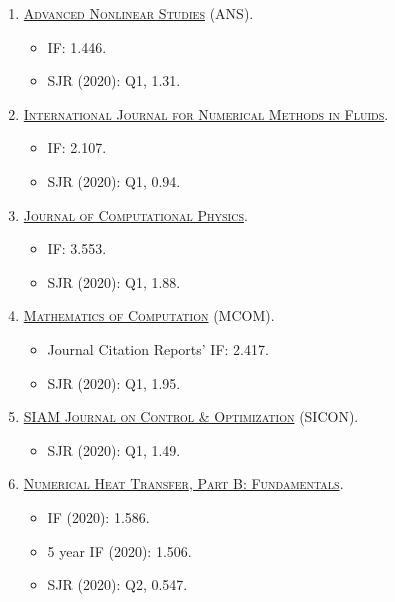 \documentclass{article}
\numberwithin{equation}{section}
\begin{document}
\begin{enumerate}
	\item \textsc{\href{https://www.degruyter.com/journal/key/ans/html}{Advanced Nonlinear Studies} (ANS).}
	\begin{itemize}
		\item IF: 1.446.
		\item SJR (2020): Q1, 1.31.
	\end{itemize}
	\item \textsc{\href{https://onlinelibrary.wiley.com/journal/10970363}{International Journal for Numerical Methods in Fluids}.}
	\begin{itemize}
		\item IF: 2.107.
		\item SJR (2020): Q1, 0.94.
	\end{itemize}
	\item \textsc{\href{https://www.journals.elsevier.com/journal-of-computational-physics}{Journal of Computational Physics}.}
	\begin{itemize}
		\item IF: 3.553.
		\item SJR (2020): Q1, 1.88.
	\end{itemize}
	\item \textsc{\href{https://www.ams.org/publications/journals/journalsframework/mcom}{Mathematics of Computation} (MCOM).}
	\begin{itemize}
		\item Journal Citation Reports' IF: 2.417.
		\item SJR (2020): Q1, 1.95.
	\end{itemize}
	\item \textsc{\href{https://www.siam.org/publications/journals/siam-journal-on-control-and-optimization-sicon}{SIAM Journal on Control \& Optimization} (SICON).}
	\begin{itemize}
		\item SJR (2020): Q1, 1.49.
	\end{itemize}
	\item \textsc{\href{https://www.tandfonline.com/journals/unhb20}{Numerical Heat Transfer, Part B: Fundamentals}.}
	\begin{itemize}
		\item IF (2020): 1.586.
		\item 5 year IF (2020): 1.506.
		\item SJR (2020): Q2, 0.547.
	\end{itemize}
\end{enumerate}


\printbibliography[heading=bibintoc]
\end{document}
